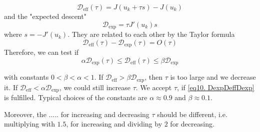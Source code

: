 \[
\mathcal{D}_{\text{eff}}(\tau) = J(u_k+\tau s)-J(u_k)
\]
and the "expected descent"
\[
	\mathcal{D}_{\text{exp}} = \tau J'(u_k)s
\]
where  $s=-J'(u_k)$. They are related to each other by the Taylor formula
\[
	\mathcal{D}_{\text{eff}}(\tau)-\mathcal{D}_{\text{exp}}(\tau)=O(\tau)
\]
Therefore, we can test if 
\begin{equation}
\alpha \mathcal{D}_{\text{exp}}(\tau)\leq \mathcal{D}_{\text{eff}}(\tau) \leq \beta \mathcal{D}_{\text{exp}} \label{eq10. DexpDeffDexp} \tag{*}
\end{equation}

with constants $0<\beta<\alpha<1$. If $\mathcal{D}_{\text{eff}} > \beta \mathcal{D}_{\text{exp}}$, then $\tau$ is too large and we decrease it. 
If $\mathcal{D}_{\text{eff}}<\alpha\mathcal{D}_{\text{exp}}$, we could still increase $\tau$. We accept $\tau$, if 
\eqref{eq10. DexpDeffDexp} is fulfilled. Typical choices of the constants are $\alpha \approx 0.9$ and $\beta \approx 0.1$.

Moreover, the ..... for increasing and decreasing $\tau$ should be different, i.e. multiplying with $1.5$, for increasing and dividing by $2$ for decreasing.

